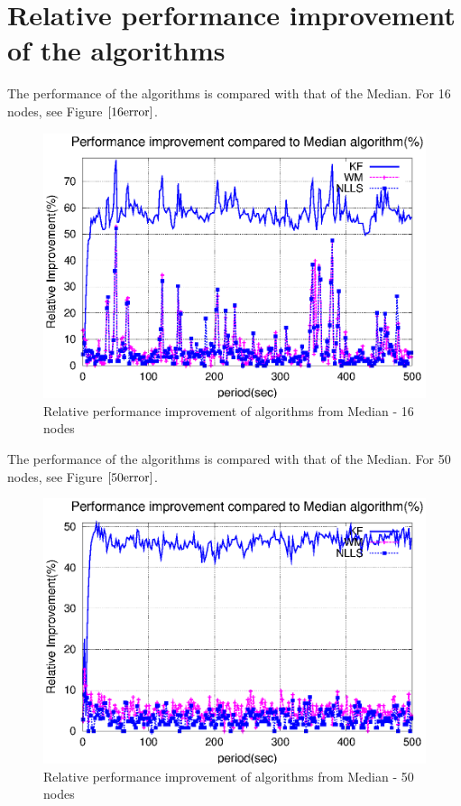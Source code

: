 \documentclass[a4paper,10pt]{report}
\begin{document}
\section{\textbf{Relative performance improvement of the algorithms}}
The performance of the algorithms is compared with that of the Median. For 16 nodes, see Figure $\ref{16error}$.
\begin{figure}[!h]
\centering
\includegraphics[width= 0.7 \textwidth]{16output-error}
\caption{Relative performance improvement of algorithms from Median - 16 nodes} \label{16error}
\end{figure}
The performance of the algorithms is compared with that of the Median. For 50 nodes, see Figure $\ref{50error}$.
\begin{figure}[!h]
\centering
\includegraphics[width=0.7  \textwidth]{50output-error}
\caption{Relative performance improvement of algorithms from Median - 50 nodes} \label{50error}
\end{figure}
\end{document}
